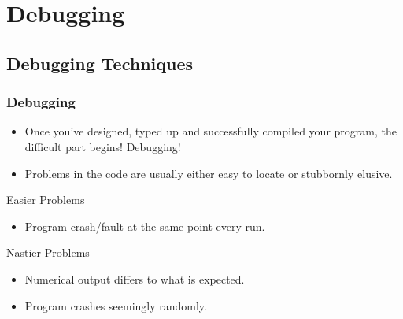 \documentclass[smaller,table]{beamer} %
\begin{document}
\section{Debugging}
\subsection{Debugging Techniques}
\begin{frame}
\frametitle{Debugging}
\begin{itemize}
\item Once you've designed, typed up and successfully compiled your program, the difficult part begins! Debugging!
\item Problems in the code are usually either easy to locate or stubbornly elusive.
\end{itemize}

\begin{exampleblock}{Easier Problems}
\begin{itemize}
\item Program crash/fault at the same point every run.
\end{itemize}
\end{exampleblock}

\begin{alertblock}{Nastier Problems}
\begin{itemize}
\item Numerical output differs to what is expected.
\item Program crashes seemingly randomly.
\end{itemize}
\end{alertblock}
\end{frame}
\end{document}
